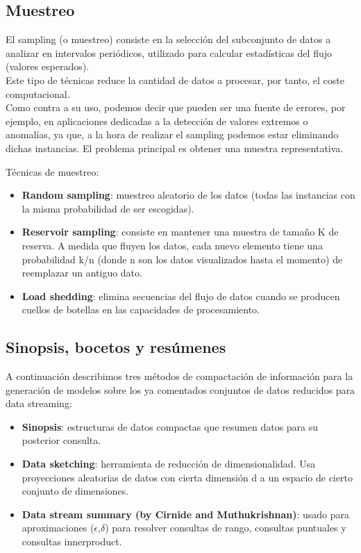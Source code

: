 \subsection{Muestreo}

El sampling (o muestreo) consiste en la selección del subconjunto de datos a analizar en intervalos periódicos, utilizado para calcular estadísticas del flujo (valores esperados).\\
Este tipo de técnicas reduce la cantidad de datos a procesar, por tanto, el coste computacional.\\
Como contra a su uso, podemos decir que pueden ser una fuente de errores, por ejemplo, en aplicaciones dedicadas a la detección de valores extremos o anomalías, ya que, a la hora de realizar el sampling podemos estar eliminando dichas instancias. El problema principal es obtener una muestra representativa.


Técnicas de muestreo:
\begin{itemize}
	\item \textbf{Random sampling}: muestreo aleatorio de los datos (todas las instancias con la misma probabilidad de ser escogidas).
	\item \textbf{Reservoir sampling}: consiste en mantener una muestra de tamaño K de reserva. A medida que fluyen los datos, cada nuevo elemento tiene una probabilidad k/n (donde n son los datos visualizados hasta el momento) de reemplazar un antiguo dato.
	\item \textbf{Load shedding}: elimina secuencias del flujo de datos cuando se producen cuellos de botellas en las capacidades de procesamiento.
\end{itemize}

\subsection{Sinopsis, bocetos y resúmenes}
A continuación describimos tres métodos de compactación de información para la generación de modelos sobre los ya comentados conjuntos de datos reducidos para data streaming:

\begin{itemize}
	\item \textbf{Sinopsis}: estructuras de datos compactas que resumen datos para su posterior consulta.
	\item \textbf{Data sketching}: herramienta de reducción de dimensionalidad. Usa proyecciones aleatorias de datos con cierta dimensión d a un espacio de cierto conjunto de dimensiones.
	\item \textbf{Data stream summary (by Cirnide and Muthukrishnan)}: usado para aproximaciones ($\epsilon$,$\delta$) para resolver consultas de rango, consultas puntuales y consultas innerproduct.
\end{itemize}





